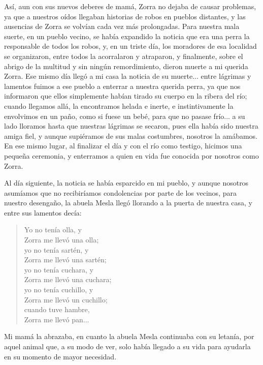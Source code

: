 Así, aun con sus nuevos deberes de mamá, Zorra no dejaba de causar problemas, ya que a nuestros oídos llegaban historias de robos en pueblos distantes, y las ausencias de Zorra se volvían cada vez más prolongadas.
Para nuestra mala suerte, en un pueblo vecino, se había expandido la noticia que era una perra la responsable de todos los robos, y, en un triste día, los moradores de esa localidad se organizaron, entre todos la acorralaron y atraparon, y finalmente, sobre el abrigo de la multitud y sin ningún remordimiento, dieron muerte a mi querida Zorra. 
Ese mismo día llegó a mi casa la noticia de su muerte... entre lágrimas y lamentos fuimos a ese pueblo a enterrar a nuestra querida perra, ya que nos informaron que ellos simplemente habían tirado su cuerpo en la ribera del río; cuando llegamos allá, la encontramos helada e inerte, e instintivamente la envolvimos en un paño, como si fuese un bebé, para que no pasase frío... a su lado lloramos hasta que nuestras lágrimas se secaron, pues ella había sido nuestra amiga fiel, y aunque supiéramos de sus malas costumbres, nosotros la amábamos.
En ese mismo lugar, al finalizar el día y con el río como testigo, hicimos una pequeña ceremonia, y enterramos a quien en vida fue conocida por nosotros como Zorra.

Al día siguiente, la noticia se había esparcido en mi pueblo, y aunque nosotros asumíamos que no recibiríamos condolencias por parte de los vecinos, para nuestro desengaño, la abuela Mesla llegó llorando a la puerta de nuestra casa, y entre sus lamentos decía:
\begin{quotation}
\noindent Yo no tenía olla, y \\Zorra me llevó una olla;\\ 
yo no tenía sartén, y \\Zorra me llevó una sartén;\\ 
yo no tenía cuchara, y \\Zorra me llevó una cuchara;\\
yo no tenía cuchillo, y \\Zorra me llevó un cuchillo;\\
cuando tuve hambre, \\Zorra me llevó pan...  
\end{quotation}
Mi mamá la abrazaba, en cuanto la abuela Mesla continuaba con su letanía, por aquel animal que, a su modo de ver, solo había llegado a su vida para ayudarla en su momento de mayor necesidad.

